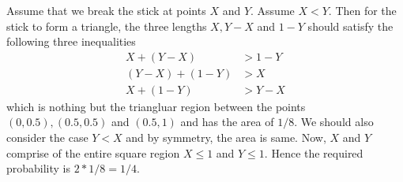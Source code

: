 \documentclass[../../probability-notes.tex]{subfiles}
\begin{document}
        Assume that we break the stick at points $X$ and $Y$. Assume $X < Y$. Then for the stick to form a triangle, the three lengths $X, Y-X$ and $1-Y$ should satisfy the following three inequalities
        \begin{align*}
            X+(Y-X) &> 1-Y\\
            (Y-X) + (1-Y) &> X\\
            X + (1-Y) &> Y-X
        \end{align*}
        which is nothing but the triangluar region between the points $(0, 0.5), (0.5, 0.5)$ and $(0.5, 1)$ and has the area of $1/8$. We should also consider the case $Y < X$ and by symmetry, the area is same. Now, $X$ and $Y$ comprise of the entire square region $X \leq 1$ and $Y \leq 1$. Hence the required probability is $2 * 1/8 = 1/4$.
\end{document}
